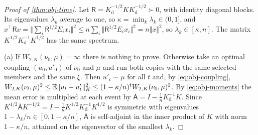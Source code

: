 \begin{proof}[Proof of \cref{thm:obj-time}]
Let $\mathsf R=K_{\mathrm d}^{-1/2}KK_{\mathrm d}^{-1/2}\succ0$, with identity diagonal blocks. Its eigenvalues $\lambda_k$ average to one, so $\kappa=\min_k\lambda_k\in(0,1]$, and $x^\top\mathsf Rx=\Vert\sum_i\mathsf R^{1/2}E_ix_i\Vert^2\le n\sum_i\Vert\mathsf R^{1/2}E_ix_i\Vert^2=n\Vert x\Vert^2$, so $\lambda_k\in[\kappa,n]$. The matrix $K^{1/2}K_{\mathrm d}^{-1}K^{1/2}$ has the same spectrum.

(a) If $W_{2,K}(\nu_0,\mu)=\infty$ there is nothing to prove. Otherwise take an optimal coupling $(u_0,u'_0)$ of $\nu_0$ and $\mu$ and run both copies with the same selected members and the same $\xi$. Then $u'_t\sim\mu$ for all $t$ and, by \eqref{eq:obj-coupling}, $W_{2,K}(\nu_t,\mu)^2\le\mathbb{E}\Vert u_t-u'_t\Vert_K^2\le(1-\kappa/n)^tW_{2,K}(\nu_0,\mu)^2$. By \eqref{eq:obj-moments} the mean error is multiplied at each event by $\bar{\mathsf A}=I-\frac1nK_{\mathrm d}^{-1}K$. Since $K^{1/2}\bar{\mathsf A}K^{-1/2}=I-\frac1nK^{1/2}K_{\mathrm d}^{-1}K^{1/2}$ is symmetric with eigenvalues $1-\lambda_k/n\in[0,1-\kappa/n]$, $\bar{\mathsf A}$ is self-adjoint in the inner product of $K$ with norm $1-\kappa/n$, attained on the eigenvector of the smallest $\lambda_k$.


\end{proof}
